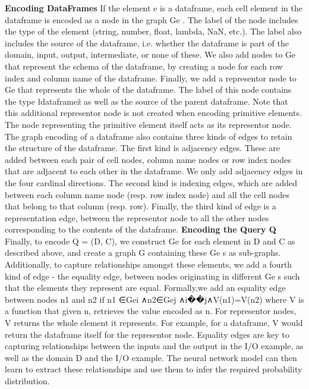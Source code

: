 \documentclass{article}
\begin{document}
\textbf{Encoding DataFrames} If the element e is a dataframe, each cell element in the dataframe is encoded as a node in the graph Ge . The label of the node includes the type of the element (string, number, float, lambda, NaN, etc.). The label also includes the source of the dataframe, i.e. whether the dataframe is part of the domain, input, output, intermediate, or none of these. We also add nodes to Ge that represent the schema of the dataframe, by creating a node for each row index and column name of the dataframe. Finally, we add a representor node to Ge that represents the whole of the dataframe. The label of this node contains the type łdataframež as well as the source of the parent dataframe. Note that this additional representor node is not created when encoding primitive elements. The node representing the primitive element itself acts as its representor node.
The graph encoding of a dataframe also contains three kinds of edges to retain the structure of the dataframe. The first kind is adjacency edges. These are added between each pair of cell nodes, column name nodes or row index nodes that are adjacent to each other in the dataframe. We only add adjacency edges in the four cardinal directions. The second kind is indexing edges, which are added between each column name node (resp. row index node) and all the cell nodes that belong to that column (resp. row). Finally, the third kind of edge is a representation edge, between the representor node to all the other nodes corresponding to the contents of the dataframe.
\textbf{Encoding the Query Q} Finally, to encode Q = (D, C), we construct Ge for each element in D and C as described above, and create a graph G containing these Ge s as sub-graphs. Additionally, to capture relationships amongst these elements, we add a fourth kind of edge - the equality edge, between nodes originating in different Ge s such that the elements they represent are equal. Formally,we add an equality edge between nodes n1 and n2 if n1 ∈Gei ∧n2∈Gej ∧i��j∧V(n1)=V(n2) where V is a function that given n, retrieves the value encoded as n. For representor nodes, V returns the whole element it represents. For example, for a dataframe, V would return the dataframe itself for the representor node.
Equality edges are key to capturing relationships between the inputs and the output in the I/O example, as well as the domain D and the I/O example. The neural network model can then learn to extract these relationships and use them to infer the required probability distribution.
\end{document}
